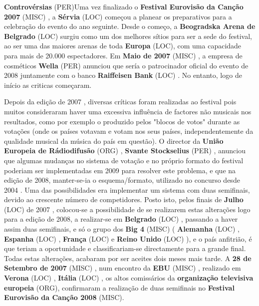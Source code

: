 \documentclass[12pt,a4paper]{article}
\begin{document}
\textbf{Controvérsias} (PER)Uma vez finalizado o \textbf{Festival Eurovisão da Canção 2007} (MISC) , a \textbf{Sérvia} (LOC) começou a planear os preparativos para a celebração do evento do ano seguinte. Desde o começo, a \textbf{Beogradska Arena de Belgrado} (LOC) surgiu como um dos melhores sítios para ser a sede do festival, ao ser uma das maiores arenas de toda \textbf{Europa} (LOC), com uma capacidade para mais de 20.000 espectadores. Em \textbf{Maio de 2007} (MISC) , a empresa de cosméticos \textbf{Wella} (PER) anunciou que sería o patrocinador oficial do evento de 2008 juntamente com o banco \textbf{Raiffeisen Bank} (LOC) . No entanto, logo de início as criticas começaram.

Depois da edição de 2007 , diversas críticas foram realizadas ao festival pois muitos consideraram haver uma excessiva influência de factores não musicais nos resultados, como por exemplo o produzido pelos "blocos de votos" durante as votações (onde os países votavam e votam nos seus países, independentemente da qualidade musical da música do país em questão). O director da \textbf{União Europeia de Rádiodifusão} (ORG) , \textbf{Svante Stockselius} (PER) , anunciou que algumas mudanças no sistema de votação e no próprio formato do festival poderiam ser implementadas em 2009 para resolver este problema, e que na edição de 2008, manter-se-ia o esquema/formato, utilizado no concurso desde 2004 . Uma das possibilidades era implementar um sistema com duas semifinais, devido ao crescente número de competidores. Posto isto, pelos finais de \textbf{Julho} (LOC) de 2007 , colocou-se a possibilidade de se realizarem estas alterações logo para a edição de 2008, a realizar-se em \textbf{Belgrado} (LOC) , passando a haver assim duas semifinais, e só o grupo dos \textbf{Big 4} (MISC) ( \textbf{Alemanha} (LOC) , \textbf{Espanha} (LOC) , \textbf{França} (LOC) e \textbf{Reino Unido} (LOC) ), e o país anfitrião, é que teriam a oportunidade e classificariam-se directamente para a grande final. Todas estas alterações, acabaram por ser aceites dois meses mais tarde. A \textbf{28 de Setembro de 2007} (MISC) , num encontro da \textbf{EBU} (MISC) , realizado em \textbf{Verona} (LOC) , \textbf{Itália} (LOC) , os altos comissários da \textbf{organização televisiva europeia} (ORG), confirmaram a realização de duas semifinais no \textbf{Festival Eurovisão da Canção 2008} (MISC).
\end{document}
